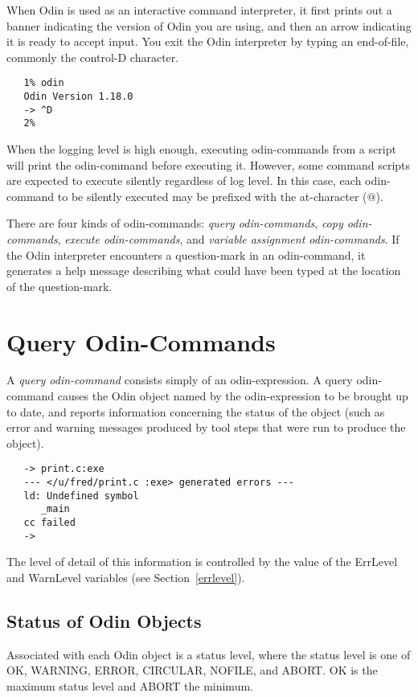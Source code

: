 When Odin is used as an interactive command interpreter,
it first prints out a banner indicating the version of Odin you are using,
and then an arrow indicating it is ready to accept input.
You exit the Odin interpreter by typing an end-of-file,
commonly the control-D character.
\begin{verbatim}
   1% odin
   Odin Version 1.18.0
   -> ^D
   2%
\end{verbatim}

When the logging level is high enough, executing odin-commands from a
script will print the odin-command before executing it.  However, some
command scripts are expected to execute silently regardless of log
level.  In this case, each odin-command to be silently executed may be
prefixed with the at-character ({\ex @}).

There are four kinds of odin-commands: {\em query odin-commands},
{\em copy odin-commands}, {\em execute odin-commands},
and {\em variable assignment odin-commands}.
If the Odin interpreter encounters a question-mark in an odin-command,
it generates a help message describing what could have been
typed at the location of the question-mark.


\section{Query Odin-Commands}
\label{query}

A {\em query odin-command} consists simply of an odin-expression.
A query odin-command causes the Odin object named by the odin-expression
to be brought up to date,
and reports information concerning the status of the object
(such as error and warning messages produced by tool steps that were run
to produce the object).
\begin{verbatim}
   -> print.c:exe
   --- </u/fred/print.c :exe> generated errors ---
   ld: Undefined symbol 
      _main 
   cc failed
   ->
\end{verbatim}
The level of detail of this information is controlled by the value of the
{\ex ErrLevel} and {\ex WarnLevel} variables (see Section~\ref{errlevel}).

\subsection{Status of Odin Objects}

Associated with each Odin object is a status level,
where the status level is one of {\ex OK}, {\ex WARNING}, {\ex ERROR},
{\ex CIRCULAR}, {\ex NOFILE}, and {\ex ABORT}.
{\ex OK} is the maximum status level and {\ex ABORT} the minimum.

